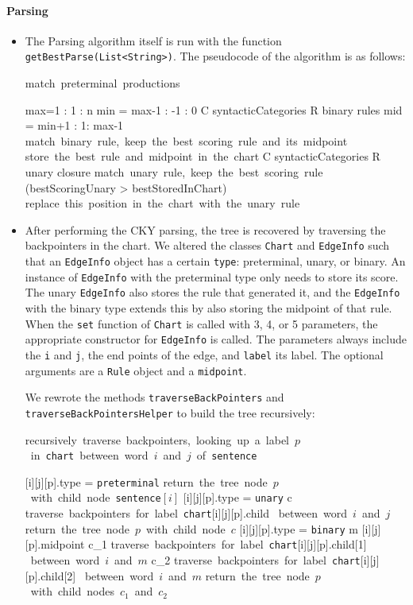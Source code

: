 \documentclass{article}
\begin{document}
\paragraph{Parsing}
\begin{itemize}
\item 
The Parsing algorithm itself is run with the function {\tt getBestParse(List<String>)}. The pseudocode of the algorithm is as follows:
\begin{program}
\mbox{match preterminal productions}

\FOR max=1 : 1 :  n
      \FOR min = max-1 : -1 : 0
              \FOREACH C \in syntacticCategories
\FOREACH R \in binary rules
\FOR mid = min+1 : 1: max-1
	          \mbox{match binary rule, keep the best scoring rule and its midpoint}
\END
\END
              \mbox{store the best rule and midpoint in the chart}
\END
 \FOREACH C \in syntacticCategories
\FOREACH R \in unary closure
 \mbox{match unary rule, keep the best scoring rule}
\END
\IF (bestScoringUnary > bestStoredInChart)
\mbox{replace this position in the chart with the unary rule}
           
\END
\END
\END
\END

\end{program}
\item After performing the CKY parsing, the tree is recovered by traversing the backpointers in the chart. 
We altered the classes {\tt Chart} and {\tt EdgeInfo} such that an {\tt EdgeInfo} object has a certain {\tt type}: preterminal, unary, or binary.
An instance of {\tt EdgeInfo} with the preterminal type only needs to store its score. The unary {\tt EdgeInfo} also stores the rule that generated it, and the {\tt EdgeInfo} with the binary type extends this by also storing the midpoint of that rule. When the {\tt set} function of {\tt Chart} is called with 3, 4, or 5 parameters, the appropriate constructor for {\tt EdgeInfo} is called. The parameters always include the {\tt i} and {\tt j}, the end points of the edge, and {\tt label} its label. The optional arguments are a {\tt Rule} object and a {\tt midpoint}.

We rewrote the methods {\tt traverseBackPointers} and {\tt traverseBackPointersHelper} to build the tree recursively:

\begin{program}
\mbox{recursively traverse backpointers, looking up a label $p$ in {\tt chart} between word $i$ and $j$ of {\tt sentence} }

[i][j][p].type = {\tt preterminal}
	\mbox{return the tree node $p$ with child node {\tt sentence}$[i]$}
\FI
{}[i][j][p].type = {\tt unary}
	c \gets \mbox{traverse backpointers for label }{\tt chart}[i][j][p].child \mbox{ between word $i$ and $j$}
	\mbox{return the tree node $p$ with child node $c$}
\FI
{}[i][j][p].type = {\tt binary}
	m [j][p].midpoint
	c_1 \gets \mbox{traverse backpointers for label }{\tt chart}[i][j][p].child[1] \mbox{ between word $i$ and $m$}
    c_2 \gets \mbox{traverse backpointers for label }{\tt chart}[i][j][p].child[2] \mbox{ between word $i$ and $m$}
	\mbox{return the tree node $p$ with child nodes $c_1$ and $c_2$}
\FI


\end{program}
\end{itemize}
\end{document}
